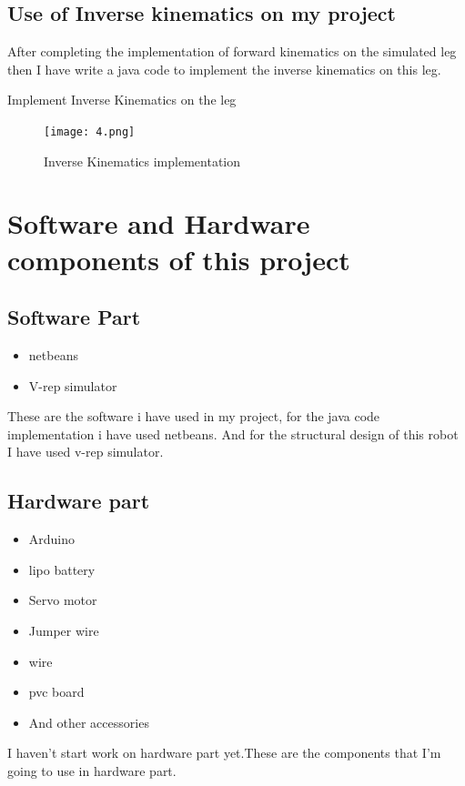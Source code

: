 \documentclass [a4paper ] {report}
\begin{document}
\newpage

\subsection{Use of Inverse kinematics on my project}
After completing the implementation of forward kinematics on the simulated leg then I have write a java code to implement the inverse kinematics on this leg. 

\begin{center}
Implement Inverse Kinematics on the leg\vadjust{\vskip 10mm \vskip 0pt}
\begin{figure}[h]
\begin{center}
\texttt{[image: 4.png]}
\end{center}
  \caption{Inverse Kinematics implementation \vadjust{\vskip 10mm \vskip 0pt}}
\label{fig:fig2}
\end{figure}
\end{center}
\hfill \break

\newpage

\section{Software and Hardware components of this project}

\subsection{Software Part}

\begin{itemize}
\item netbeans
\item V-rep simulator
\end{itemize}
These are the software i have used in my project, for the java code implementation i have used netbeans. And for  the structural design of this robot I have used v-rep simulator.

\subsection{Hardware part}

\begin{itemize}
\item Arduino 
\item lipo battery
\item Servo motor
\item Jumper wire
\item wire 
\item pvc board
\item And other accessories
\end{itemize}
I haven't start work on hardware part yet.These are the components that I'm going to use in hardware part. 
\end{document}
